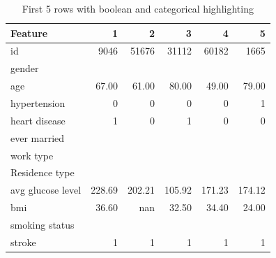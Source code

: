 \begin{table}[H]
    \centering
    \small


    \caption{First 5 rows with boolean and categorical highlighting}
    \label{tab:first_5_rows_colored}
    \begin{tabular}{@{} l r r r r r @{}}
        \toprule
        \textbf{Feature} & \textbf{1} & \textbf{2} & \textbf{3} & \textbf{4} & \textbf{5} \\
        \midrule
        id & 9046 & 51676 & 31112 & 60182 & 1665 \\
        gender & \cellcolor{colMale}{Male} & \cellcolor{colFemale}{Female} & \cellcolor{colMale}{Male} & \cellcolor{colFemale}{Female} & \cellcolor{colFemale}{Female} \\
        age & 67.00 & 61.00 & 80.00 & 49.00 & 79.00 \\
        hypertension & \cellcolor{boolFalse}0 & \cellcolor{boolFalse}0 & \cellcolor{boolFalse}0 & \cellcolor{boolFalse}0 & \cellcolor{boolTrue}1 \\
        heart disease & \cellcolor{boolTrue}1 & \cellcolor{boolFalse}0 & \cellcolor{boolTrue}1 & \cellcolor{boolFalse}0 & \cellcolor{boolFalse}0 \\
        ever married & \cellcolor{colYes}{Yes} & \cellcolor{colYes}{Yes} & \cellcolor{colYes}{Yes} & \cellcolor{colYes}{Yes} & \cellcolor{colYes}{Yes} \\
        work type & \cellcolor{colPrivate}{Private} & \cellcolor{colSelfemployed}{Self-employed} & \cellcolor{colPrivate}{Private} & \cellcolor{colPrivate}{Private} & \cellcolor{colSelfemployed}{Self-employed} \\
        Residence type & \cellcolor{colUrban}{Urban} & \cellcolor{colRural}{Rural} & \cellcolor{colRural}{Rural} & \cellcolor{colUrban}{Urban} & \cellcolor{colRural}{Rural} \\
        avg glucose level & 228.69 & 202.21 & 105.92 & 171.23 & 174.12 \\
        bmi & 36.60 & nan & 32.50 & 34.40 & 24.00 \\
        smoking status & \cellcolor{colformerlysmoked}{formerly smoked} & \cellcolor{colneversmoked}{never smoked} & \cellcolor{colneversmoked}{never smoked} & \cellcolor{colsmokes}{smokes} & \cellcolor{colneversmoked}{never smoked} \\
        stroke & \cellcolor{boolTrue}1 & \cellcolor{boolTrue}1 & \cellcolor{boolTrue}1 & \cellcolor{boolTrue}1 & \cellcolor{boolTrue}1 \\
        \bottomrule
    \end{tabular}
\end{table}